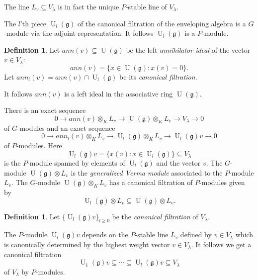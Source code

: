 \documentclass{amsart}
\theoremstyle{plain}
\theoremstyle{definition}
\newtheorem{definition}[theorem]{Definition}
\theoremstyle{remark}
\numberwithin{equation}{theorem}
\begin{document}
The line $L_v \subseteq {V_\lambda}$ is in fact the unique $P$-stable line of
${V_\lambda}$. 

The $l$'th piece ${\operatorname{U}}_l({\mathfrak{g}})$ of the canonical filtration of the
enveloping algebra is a $G$-module via the adjoint representation. 
It follows ${\operatorname{U}}_l({\mathfrak{g}})$ is a $P$-module.
\begin{definition} Let $ann(v)\subseteq {\operatorname{U}}({\mathfrak{g}})$ be the left
  \emph{annihilator ideal} of the vector $v\in {V_\lambda}$:
\[ ann(v)=\{x\in {\operatorname{U}}({\mathfrak{g}}) : x(v)=0\}.\]
 Let
  $ann_l(v)=ann(v)\cap {\operatorname{U}}_l({\mathfrak{g}})$ be its \emph{canonical filtration}.
\end{definition}
It follows $ann(v)$ is a left ideal in the associative ring ${\operatorname{U}}({\mathfrak{g}})$.

There is an exact sequence
\[ 0\rightarrow ann(v)\otimes_K L_v \rightarrow {\operatorname{U}}({\mathfrak{g}})\otimes_K L_v
\rightarrow {V_\lambda} \rightarrow 0 \]
of $G$-modules
and an exact sequence
\[ 0\rightarrow ann_l(v)\otimes_K L_v \rightarrow {\operatorname{U}}_l({\mathfrak{g}})\otimes_K L_v
\rightarrow {\operatorname{U}}_l({\mathfrak{g}})v \rightarrow 0 \]
of $P$-modules. Here 
\[ {\operatorname{U}}_l({\mathfrak{g}})v=\{ x(v): x\in {\operatorname{U}}_l({\mathfrak{g}}) \} \subseteq {V_\lambda} \]
is the $P$-module
spanned by elements of ${\operatorname{U}}_l({\mathfrak{g}})$ and the vector $v$.
The $G$-module ${\operatorname{U}}({\mathfrak{g}})\otimes L_v$ is the \emph{generalized Verma
  module} associated to the $P$-module $L_v$. The $G$-module
${\operatorname{U}}({\mathfrak{g}})\otimes_K L_v$ has a canonical filtration of $P$-modules given by 
\[ {\operatorname{U}}_l({\mathfrak{g}})\otimes L_v \subseteq {\operatorname{U}}({\mathfrak{g}})\otimes L_v .\]

\begin{definition} Let $\{{\operatorname{U}}_l({\mathfrak{g}})v\}_{l\geq 0}$ be the \emph{canonical
  filtration} of ${V_\lambda}$.
\end{definition}
The $P$-module ${\operatorname{U}}_l({\mathfrak{g}})v$ depends on the $P$-stable line $L_v$
defined by $v\in {V_\lambda}$ 
which is canonically determined by the highest weight vector $v\in
{V_\lambda}$.
It follows we get a canonical filtration
\[ {\operatorname{U}}_1({\mathfrak{g}})v\subseteq \cdots \subseteq {\operatorname{U}}_l({\mathfrak{g}})v\subseteq {V_\lambda} \] 
of ${V_\lambda}$ by $P$-modules.
\end{document}
